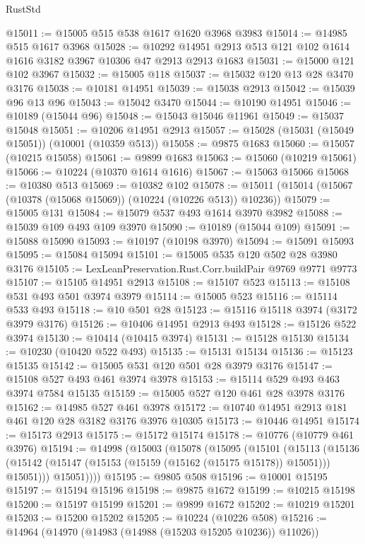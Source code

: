 \begin{lexlean}{RustStd}
\begin{coremodule}
@15011 := @15005 @515 @538 @1617 @1620 @3968 @3983
@15014 := @14985 @515 @1617 @3968
@15028 := @10292 @14951 @2913 @513 @121 @102 @1614 @1616 @3182 @3967 @10306 @47 @2913 @2913 @1683
@15031 := @15000 @121 @102 @3967
@15032 := @15005 @118
@15037 := @15032 @120 @13 @28 @3470 @3176
@15038 := @10181 @14951
@15039 := @15038 @2913
@15042 := @15039 @96 @13 @96
@15043 := @15042 @3470
@15044 := @10190 @14951
@15046 := @10189 (@15044 @96)
@15048 := @15043 @15046 @11961
@15049 := @15037 @15048
@15051 := @10206 @14951 @2913
@15057 := @15028 (@15031 (@15049 @15051)) (@10001 (@10359 @513))
@15058 := @9875 @1683
@15060 := @15057 (@10215 @15058)
@15061 := @9899 @1683
@15063 := @15060 (@10219 @15061)
@15066 := @10224 (@10370 @1614 @1616)
@15067 := @15063 @15066
@15068 := @10380 @513
@15069 := @10382 @102
@15078 := @15011 (@15014 (@15067 (@10378 (@15068 @15069)) (@10224 (@10226 @513)) @10236))
@15079 := @15005 @131
@15084 := @15079 @537 @493 @1614 @3970 @3982
@15088 := @15039 @109 @493 @109 @3970
@15090 := @10189 (@15044 @109)
@15091 := @15088 @15090
@15093 := @10197 (@10198 @3970)
@15094 := @15091 @15093
@15095 := @15084 @15094
@15101 := @15005 @535 @120 @502 @28 @3980 @3176
@15105 := LexLeanPreservation.Rust.Corr.buildPair @9769 @9771 @9773
@15107 := @15105 @14951 @2913
@15108 := @15107 @523
@15113 := @15108 @531 @493 @501 @3974 @3979
@15114 := @15005 @523
@15116 := @15114 @533 @493
@15118 := @10 @501 @28
@15123 := @15116 @15118 @3974 (@3172 @3979 @3176)
@15126 := @10406 @14951 @2913 @493
@15128 := @15126 @522 @3974
@15130 := @10414 (@10415 @3974)
@15131 := @15128 @15130
@15134 := @10230 (@10420 @522 @493)
@15135 := @15131 @15134
@15136 := @15123 @15135
@15142 := @15005 @531 @120 @501 @28 @3979 @3176
@15147 := @15108 @527 @493 @461 @3974 @3978
@15153 := @15114 @529 @493 @463 @3974 @7584 @15135
@15159 := @15005 @527 @120 @461 @28 @3978 @3176
@15162 := @14985 @527 @461 @3978
@15172 := @10740 @14951 @2913 @181 @461 @120 @28 @3182 @3176 @3976 @10305
@15173 := @10446 @14951
@15174 := @15173 @2913
@15175 := @15172 @15174
@15178 := @10776 (@10779 @461 @3976)
@15194 := @14998
    (@15003
      (@15078
        (@15095
          (@15101
            (@15113
              (@15136 (@15142 (@15147 (@15153 (@15159 (@15162 (@15175 @15178)) @15051))) @15051)))
            @15051))))
@15195 := @9805 @508
@15196 := @10001 @15195
@15197 := @15194 @15196
@15198 := @9875 @1672
@15199 := @10215 @15198
@15200 := @15197 @15199
@15201 := @9899 @1672
@15202 := @10219 @15201
@15203 := @15200 @15202
@15205 := @10224 (@10226 @508)
@15216 := @14964
    (@14970 (@14983 (@14988 (@15203 @15205 @10236)) @11026))

\end{coremodule}
\end{lexlean}
